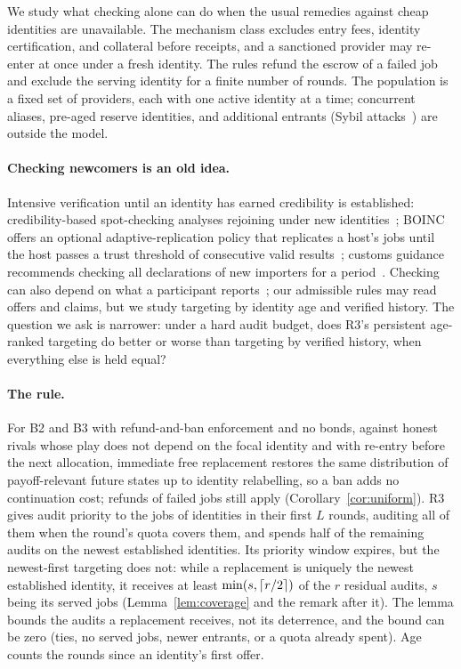 \documentclass[11pt]{article}
\begin{document}
We study what checking alone can do when the usual remedies against cheap identities are unavailable. The mechanism class excludes entry fees, identity certification, and collateral before receipts, and a sanctioned provider may re-enter at once under a fresh identity. The rules refund the escrow of a failed job and exclude the serving identity for a finite number of rounds. The population is a fixed set of providers, each with one active identity at a time; concurrent aliases, pre-aged reserve identities, and additional entrants (Sybil attacks~\cite{douceur2002sybil}) are outside the model.

\paragraph{Checking newcomers is an old idea.} Intensive verification until an identity has earned credibility is established: credibility-based spot-checking analyses rejoining under new identities~\cite{sarmenta2001ccgrid,sarmenta2001sabotage}; BOINC offers an optional adaptive-replication policy that replicates a host's jobs until the host passes a trust threshold of consecutive valid results~\cite{anderson2009diversity,boincwiki}; customs guidance recommends checking all declarations of new importers for a period~\cite{walsh2003postrelease}. Checking can also depend on what a participant reports~\cite{zarkoob2020spot}; our admissible rules may read offers and claims, but we study targeting by identity age and verified history. The question we ask is narrower: under a hard audit budget, does R3's persistent age-ranked targeting do better or worse than targeting by verified history, when everything else is held equal?

\paragraph{The rule.} For B2 and B3 with refund-and-ban enforcement and no bonds, against honest rivals whose play does not depend on the focal identity and with re-entry before the next allocation, immediate free replacement restores the same distribution of payoff-relevant future states up to identity relabelling, so a ban adds no continuation cost; refunds of failed jobs still apply (Corollary~\ref{cor:uniform}). R3 gives audit priority to the jobs of identities in their first $L$ rounds, auditing all of them when the round's quota covers them, and spends half of the remaining audits on the newest established identities. Its priority window expires, but the newest-first targeting does not: while a replacement is uniquely the newest established identity, it receives at least $\min(s, \lceil r/2 \rceil)$ of the $r$ residual audits, $s$ being its served jobs (Lemma~\ref{lem:coverage} and the remark after it). The lemma bounds the audits a replacement receives, not its deterrence, and the bound can be zero (ties, no served jobs, newer entrants, or a quota already spent). Age counts the rounds since an identity's first offer.
\end{document}
